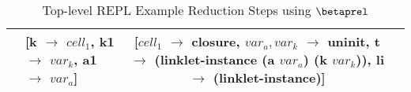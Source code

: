 \begin{table}[!h]
\begin{tabular}{l >{\centering\arraybackslash}m{} c c}
\begin{lstlisting}[style=numberless]
	\end{lstlisting} & \thead{[k $\rightarrow$ $cell_1$,\\k1 $\rightarrow$ $var_k$,\\a1 $\rightarrow$ $var_a$]} & \thead{[$cell_1$ $\rightarrow$ closure,\\$var_a,var_k$ $\rightarrow$ uninit,\\t $\rightarrow$ (linklet-instance\\(a $var_a$) (k $var_k$)),\\li $\rightarrow$ (linklet-instance)]} \\ \hline
  \end{tabular}
  \caption{Top-level REPL Example Reduction Steps using $\betaprel$}
  \label{table:toplevel-example-step-by-step-formal}
\end{table}